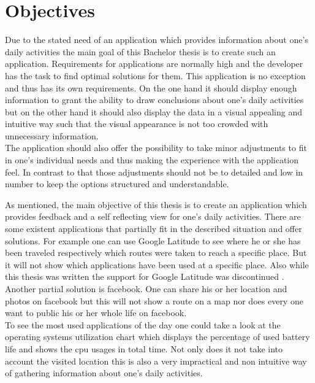 \section{Objectives}
\label{sec:objectives}

Due  to the stated need of an application which provides information about one's daily activities the main goal of this Bachelor thesis is to create such an application.
Requirements for applications are normally high and the developer has the task to find optimal solutions for them. This application is no exception and thus has its own requirements. On the one hand it should display enough information to grant the ability to draw conclusions about one's daily activities but on the other hand it should also display the data in a visual appealing and intuitive way such that the visual appearance is not too crowded with unnecessary information.\\
The application should also offer the possibility to take minor adjustments to fit in one's individual needs and thus making the experience with the application feel. In contrast to that those adjustments should not be to detailed and low in number to keep the options structured and understandable.

As  mentioned, the main objective of this thesis is to create an application which provides feedback and a self reflecting view for one's daily activities. There are some existent applications that partially fit in the described  situation and offer solutions. For example one can use Google Latitude to see where he or she has been traveled respectively which routes were taken to reach a specific place. But it will not show which applications have been used at a specific place. Also while this thesis was written the support for Google Latitude was discontinued \cite{googlelatitudedead}. Another partial solution is facebook. One can share his or her location and photos on facebook but this will not show a route on a map nor does every one want to public his or her whole life on facebook.\\
To see the most used applications of the day one could take a look at the operating systems utilization chart which displays the percentage of used battery life and shows the cpu usages in total time. Not only does it not take into account the visited location this is also a very impractical and non intuitive way of gathering information about one's daily activities.

